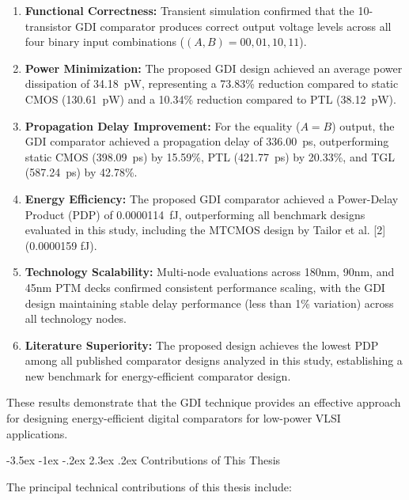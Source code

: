 \documentclass[12pt,a4paper,oneside]{report}
\makeatletter
\renewcommand\section{\@startsection {section}{1}{\z@}%
                                   {-3.5ex \@plus -1ex \@minus -.2ex}%
                                   {2.3ex \@plus.2ex}%
                                   {\normalfont\normalsize\bfseries}}
\makeatother
\begin{document}
\begin{enumerate}
\item \textbf{Functional Correctness:} Transient simulation confirmed that the 10-transistor GDI comparator produces correct output voltage levels across all four binary input combinations ($(A,B) = 00, 01, 10, 11$).
\item \textbf{Power Minimization:} The proposed GDI design achieved an average power dissipation of 34.18~pW, representing a 73.83\% reduction compared to static CMOS (130.61~pW) and a 10.34\% reduction compared to PTL (38.12~pW).
\item \textbf{Propagation Delay Improvement:} For the equality ($A=B$) output, the GDI comparator achieved a propagation delay of 336.00~ps, outperforming static CMOS (398.09~ps) by 15.59\%, PTL (421.77~ps) by 20.33\%, and TGL (587.24~ps) by 42.78\%.
\item \textbf{Energy Efficiency:} The proposed GDI comparator achieved a Power-Delay Product (PDP) of 0.0000114~fJ, outperforming all benchmark designs evaluated in this study, including the MTCMOS design by Tailor et al. [2] (0.0000159 fJ).
\item \textbf{Technology Scalability:} Multi-node evaluations across 180nm, 90nm, and 45nm PTM decks confirmed consistent performance scaling, with the GDI design maintaining stable delay performance (less than 1\% variation) across all technology nodes.
\item \textbf{Literature Superiority:} The proposed design achieves the lowest PDP among all published comparator designs analyzed in this study, establishing a new benchmark for energy-efficient comparator design.
\end{enumerate}

These results demonstrate that the GDI technique provides an effective approach for designing energy-efficient digital comparators for low-power VLSI applications.

\section{Contributions of This Thesis}

The principal technical contributions of this thesis include:
\end{document}
